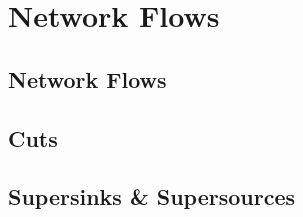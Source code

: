 \documentclass[../maths.tex]{subfiles}
\begin{document}
\chapter{Network Flows}
\section{Network Flows}
\section{Cuts}
\section{Supersinks \& Supersources}
\end{document}
